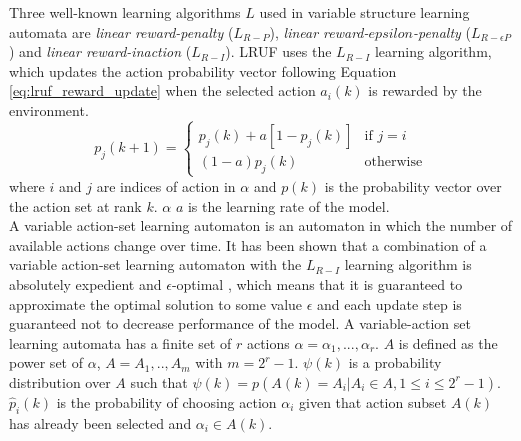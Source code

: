 Three well-known learning algorithms $L$ used in variable structure learning automata are \emph{linear reward-penalty} ($L_{R-P}$), \emph{linear reward-$epsilon$-penalty} ($L_{R-\epsilon P}$) and \emph{linear reward-inaction} ($L_{R-I}$). LRUF uses the $L_{R-I}$ learning algorithm, which updates the action probability vector following Equation \ref{eq:lruf_reward_update} when the selected action $a_i(k)$ is rewarded by the environment.
\begin{equation}
p_j(k+1)=	\begin{cases}	p_j(k)+a[1-p_j(k)] 	&\mbox{if } j=i \\ 
							(1-a)p_j(k) 		&\mbox{otherwise} 
			\end{cases} 
\label{eq:lruf_reward_update}
\end{equation}
\noindent where $i$ and $j$ are indices of action in $\alpha$ and $p(k)$ is the probability vector over the action set at rank $k$. $\alpha$ $a$ is the learning rate of the model.\\

A variable action-set learning automaton is an automaton in which the number of available actions change over time. It has been shown that a combination of a variable action-set learning automaton with the $L_{R-I}$ learning algorithm is absolutely expedient and $\epsilon$-optimal \cite{Thathachar1987}, which means that it is guaranteed to approximate the optimal solution to some value $\epsilon$ and each update step is guaranteed not to decrease performance of the model. A variable-action set learning automata has a finite set of $r$ actions $\alpha={\alpha_1,...,\alpha_r}$. $A$ is defined as the power set of $\alpha$, $A={A_1,..,A_m}$ with $m = 2^{r}-1$. $\psi(k)$ is a probability distribution over $A$ such that $\psi(k)=p(A(k)=A_i|A_i\in A, 1\le i \le 2^r-1)$. $\hat{p}_i(k)$ is the probability of choosing action $\alpha_i$ given that action subset $A(k)$ has already been selected and $\alpha_i \in A(k)$.\\

